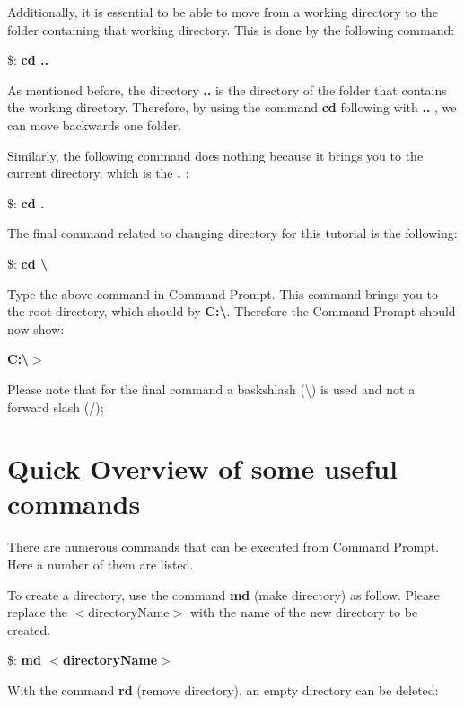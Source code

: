 \documentclass{article}
\begin{document}
	\par Additionally, it is essential to be able to move from a working directory to the folder containing that working directory. This is done by the following command:
	
	\par \$: \textbf{cd ..}
	
	\par As mentioned before, the directory \textbf{..} is the directory of the folder that contains the working directory. Therefore, by using the command \textbf{cd} following with \textbf{..} , we can move backwards one folder. 
	
	\par Similarly, the following command does nothing because it brings you to the current directory, which is the \textbf{.} :
	\par \$: \textbf{cd .}
	
	\par The final command related to changing directory for this tutorial is the following: 
	
	\par \$: \textbf{cd \textbackslash}
		
		\par Type the above command in Command Prompt. This command brings you to the root directory, which should by \textbf{C:\textbackslash}. Therefore the Command Prompt should now show:
		\par \textbf{C:\textbackslash $>$}
		\par Please note that for the final command a baskshlash (\textbackslash) is used and not a forward slash (/);
	

	\section{Quick Overview of some useful commands}\label{sec:Commands}
	
	\par There are numerous commands that can be executed from Command Prompt. Here a number of them are listed.
	
	\par To create a directory, use the command \textbf{md} (make directory) as follow. Please replace the $<$directoryName$>$ with the name of the new directory to be created. 
	
	\par \$:\textbf{ md $<$directoryName$>$}
	
	With the command \textbf{rd} (remove directory), an empty directory can be deleted:
	
\end{document}
